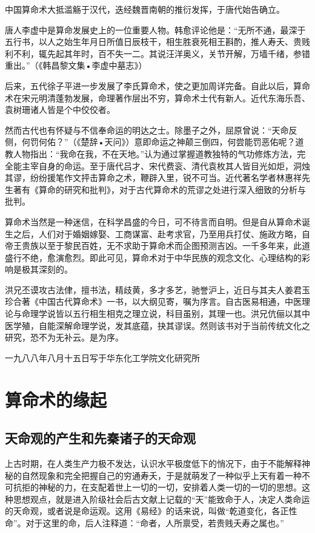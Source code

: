 \documentclass[a5paper,oneside,12pt]{ctexbook}
\begin{document}
中国算命术大抵滥觞于汉代，迭经魏晋南朝的推衍发挥，于唐代始告确立。

唐人李虚中是算命发展史上的一位重要人物。韩愈评论他是：“无所不通，最深于五行书，以人之始生年月日所值日辰枝干，相生胜衰死相王斟酌，推人寿夭、贵贱利不利，辄先起其年时，百不失一二。其说汪洋奥义，关节开解，万墙千绪，参错重出。”（《韩昌黎文集•李虚中墓志》）

后来，五代徐子平进一步发展了李氏算命术，使之更加周详完备。自此以后，算命术在宋元明清蓬勃发展，命理著作层出不穷，算命术士代有新人。近代东海乐吾、袁树珊诸人皆是个中佼佼者。

然而古代也有怀疑与不信奉命运的明达之士。除墨子之外，屈原曾说：“天命反侧，何罚何佑？”（《楚辞•天问》）意即命运之神颠三倒四，何尝能罚恶佑呢？道教人物指出：“我命在我，不在天地。”认为通过掌握道教独特的气功修炼方法，完全能主宰自身的命运。至于唐代吕才、宋代费衮、清代袁枚其人皆目光如炬，洞烛其谬，纷纷援笔作文抨击算命之术，鞭辟入里，锐不可当。近代著名学者林惠祥先生著有《算命的研究和批判》，对于古代算命术的荒谬之处进行深入细致的分析与批判。

算命术当然是一种迷信，在科学昌盛的今日，可不待言而自明。但是自从算命术诞生之后，人们对于婚姻嫁娶、工商谋富、赴考求官，乃至用兵打仗、施政方略，自帝王贵族以至于黎民百姓，无不求助于算命术而企图预测吉凶。一千多年来，此道盛行不绝，愈演愈烈。即此可见，算命术对于中华民族的观念文化、心理结构的彩响是极其深刻的。

洪兄丕谟攻古法侓，擅书法，精歧黄，多才多艺，驰誉沪上，近日与其夫人姜君玉珍合著《中国古代算命术》一书，以大纲见寄，嘱为序言。自古医易相通，中医理论与命理学说皆以五行相生相克之理立说，科目虽别，其理一也。洪兄伉俪以其中医学殖，自能深解命理学说，发其底蕴，抉其谬误。然则该书对于当前传统文化之研究，恐不为无补云。是为序。
\begin{flushright}
一九八八年八月十五日写于华东化工学院文化研究所
\end{flushright}

\mainmatter
\chapter{算命术的缘起}
\section{天命观的产生和先秦诸子的天命观}

上古时期，在人类生产力极不发达，认识水平极度低下的悄况下，由于不能解释神秘的自然现象和完全把握自己的穷通寿夭，于是就萌发了一种似乎上天有着一种不可抗拒的神秘的力，在支配着世上一切的一切，安排着人类一切的一切的思想。这种思想观点，就是进入阶级社会后古文献上记载的“天”能致命于人，决定人类命运的天命观，或者说是命运观。这用《易经》的话来说，叫做“乾道变化，各正性命”。对于这里的命，后人注释道：“命者，人所禀受，若贵贱夭寿之属也。”
\end{document}
